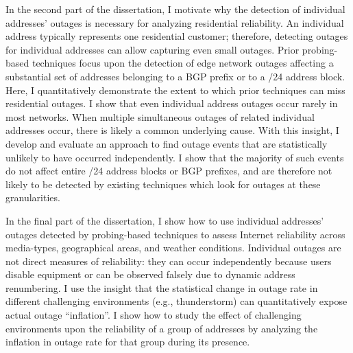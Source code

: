 


In the second part of the dissertation, I motivate why the detection of individual addresses' outages is necessary for analyzing residential reliability. An individual address typically represents one residential customer; therefore, detecting outages for individual addresses can allow capturing even small outages. Prior probing-based techniques focus upon the detection of edge network outages affecting a substantial set of addresses belonging to a BGP prefix or to a /24 address block. Here, I quantitatively demonstrate the extent to which prior techniques can miss residential outages. I show that even individual address outages occur rarely in most networks. When multiple simultaneous outages of related individual addresses occur, there is likely a common underlying cause. With this insight, I develop and evaluate an approach to find outage events that are statistically unlikely to have occurred independently. I show that the majority of such events do not affect entire /24 address blocks or BGP prefixes, and are therefore not likely to be detected by existing techniques which look for outages at these granularities. 

In the final part of the dissertation, I show how to use individual addresses' outages detected by probing-based techniques to assess Internet reliability across media-types, geographical areas, and weather conditions. Individual outages are not direct measures of reliability: they can occur independently because users disable equipment or can be observed falsely due to dynamic address renumbering. I use the insight that the statistical change in outage rate in different challenging environments (e.g., thunderstorm) can quantitatively expose actual outage “inflation”. I show how to study the effect of challenging environments upon the reliability of a group of addresses by analyzing the inflation in outage rate for that group during its presence.

